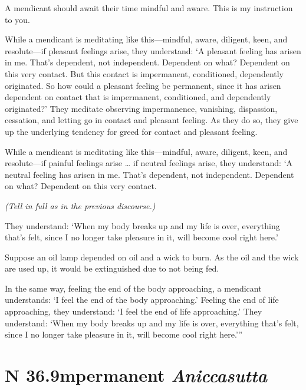 \documentclass[12pt,openany]{book}%
\newcommand*{\suttatitleacronym}[1]{\smaller[2]{#1}\vspace*{.3em}}
\newcommand*{\suttatitletranslation}[1]{\linebreak{#1}}
\newcommand*{\suttatitleroot}[1]{\linebreak\smaller[2]\itshape{#1}}
\newcommand*{\tocacronym}[1]{\hspace*{-3.3em}{#1}\quad}
\newcommand*{\toctranslation}[1]{#1}
\newcommand*{\tocroot}[1]{(\textit{#1})}
\newcommand*{\scexpansioninstructions}[1]{\begin{small}\textit{#1}\end{small}}
\begin{document}
A mendicant should await their time mindful and aware. This is my instruction to you. 

While a mendicant is meditating like this—mindful, aware, diligent, keen, and resolute—if pleasant feelings arise, they understand: ‘A pleasant feeling has arisen in me. That’s dependent, not independent. Dependent on what? Dependent on this very contact. But this contact is impermanent, conditioned, dependently originated. So how could a pleasant feeling be permanent, since it has arisen dependent on contact that is impermanent, conditioned, and dependently originated?’ They meditate observing impermanence, vanishing, dispassion, cessation, and letting go in contact and pleasant feeling. As they do so, they give up the underlying tendency for greed for contact and pleasant feeling. 

While a mendicant is meditating like this—mindful, aware, diligent, keen, and resolute—if painful feelings arise … if neutral feelings arise, they understand: ‘A neutral feeling has arisen in me. That’s dependent, not independent. Dependent on what? Dependent on this very contact. 

\scexpansioninstructions{(Tell in full as in the previous discourse.) }

They understand: ‘When my body breaks up and my life is over, everything that’s felt, since I no longer take pleasure in it, will become cool right here.’ 

Suppose an oil lamp depended on oil and a wick to burn. As the oil and the wick are used up, it would be extinguished due to not being fed. 

In the same way, feeling the end of the body approaching, a mendicant understands: ‘I feel the end of the body approaching.’ Feeling the end of life approaching, they understand: ‘I feel the end of life approaching.’ They understand: ‘When my body breaks up and my life is over, everything that’s felt, since I no longer take pleasure in it, will become cool right here.’” 

%
\section*{{\suttatitleacronym SN 36.9}{\suttatitletranslation Impermanent }{\suttatitleroot Aniccasutta}}
\addcontentsline{toc}{section}{\tocacronym{SN 36.9} \toctranslation{Impermanent } \tocroot{Aniccasutta}}
\end{document}
